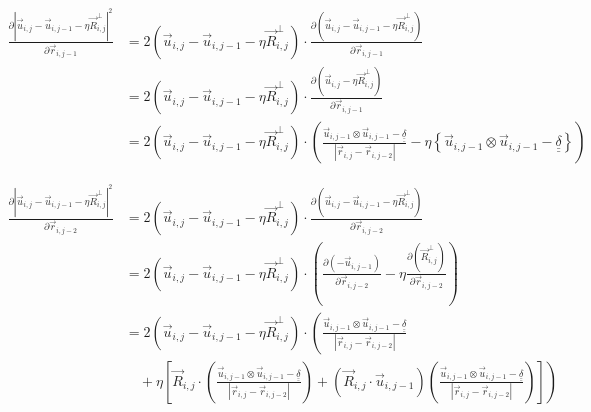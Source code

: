 \documentclass{article}
\renewcommand{\ij}{_{i,j}}
\newcommand{\ijj}{_{i,j-1}}
\newcommand{\ijjj}{_{i,j-2}}
\newcommand{\magn}[1]{\left\vert #1 \right\vert }
\renewcommand{\part}[2]{\frac{\partial #1 }{\partial #2}}
\newcommand{\ten}[1]{\underline{\underline{#1}}}
\newcommand{\rij}{\vec{r} \ij}
\newcommand{\Rij}{\vec{R} \ij}
\newcommand{\rijj}{\vec{r} \ijj}
\newcommand{\rijjj}{\vec{r} \ijjj}
\newcommand{\uij}{\vec{u} \ij}
\newcommand{\uijj}{\vec{u} \ijj}
\begin{document}
\begin{align*}
  \part{\magn{\uij - \uijj - \eta \Rij^\perp}^2 }{
    \rijj
  }
  &=
  2\left(\uij - \uijj - \eta \Rij^\perp\right) \cdot
  \part{\left(\uij - \uijj - \eta \Rij^\perp\right)}{\rijj}
  \\
  &=
  2\left(\uij - \uijj - \eta \Rij^\perp\right) \cdot
  \part{\left(\uij - \eta \Rij^\perp\right)}{\rijj} 
  \\
  &=
  2\left(\uij - \uijj - \eta \Rij^\perp\right) \cdot
  \left(
  \frac{\uijj \otimes \uijj - \ten{\delta} }{\magn{\rij - \rijjj}}
  -
  \eta 
  \left\{
  \uijj \otimes \uijj 
  -
  \ten{\delta} 
  \right\}
  \right)
\end{align*}


\begin{align*}
  \part{\magn{\uij - \uijj - \eta \Rij^\perp}^2 }{
    \rijjj
  }
  &=
  2\left(\uij - \uijj - \eta \Rij^\perp\right) \cdot
  \part{\left(\uij - \uijj - \eta \Rij^\perp\right)}{\rijjj}
  \\
  & =
  2\left(\uij - \uijj - \eta \Rij^\perp\right) \cdot
  \left(
  \part{ \left( - \uijj \right) }{\rijjj}
  -
  \eta 
  \part{\left( \Rij^\perp\right)}{\rijjj}
  \right)
  \\
  & =
  2\left(\uij - \uijj - \eta \Rij^\perp\right) 
  \cdot
  \left(
  \frac{\uijj \otimes \uijj - \ten{\delta} }{\magn{\rij - \rijjj}}
  \right. 
  \\
  &
  \quad 
  +
  \eta 
  \left.
  \left[
  \Rij \cdot 
  \left(
    \frac{\uijj \otimes \uijj - \ten{\delta}}{\magn{\rij - \rijjj}}
  \right)
  + 
  \left(
  \vec{R}\ij \cdot \vec{u} \ijj
  \right)
  {
  \left(
  \frac{\uijj \otimes \uijj - \ten{\delta} }{\magn{\rij - \rijjj}}
  \right)
  }
  \right]
  \right)
\end{align*}
\end{document}

